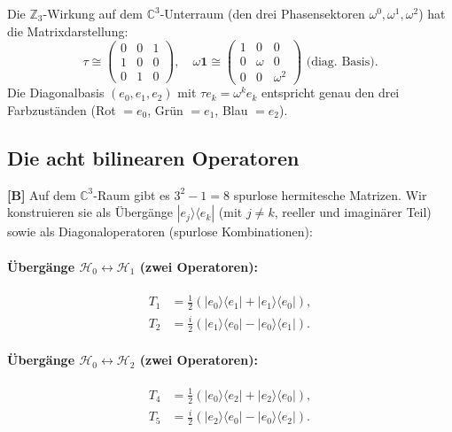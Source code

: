 Die $\mathbb{Z}_3$-Wirkung auf dem $\mathbb{C}^3$-Unterraum
(den drei Phasensektoren $\omega^0, \omega^1, \omega^2$) hat die
Matrixdarstellung:
\begin{equation}
  \tau \cong
  \begin{pmatrix} 0 & 0 & 1 \\ 1 & 0 & 0 \\ 0 & 1 & 0 \end{pmatrix},
  \quad \omega\mathbf{1} \cong
  \begin{pmatrix} 1 & 0 & 0 \\ 0 & \omega & 0 \\ 0 & 0 & \omega^2 \end{pmatrix}
  \text{ (diag. Basis)}.
  \label{eq:tau_matrix}
\end{equation}
Die Diagonalbasis $(e_0, e_1, e_2)$ mit $\tau e_k = \omega^k e_k$
entspricht genau den drei Farbzuständen (Rot $= e_0$, Grün $= e_1$,
Blau $= e_2$).

\subsection{Die acht bilinearen Operatoren}

\textbf{[B]} Auf dem $\mathbb{C}^3$-Raum gibt es $3^2 - 1 = 8$
spurlose hermitesche Matrizen. Wir konstruieren sie als Übergänge
$|e_j\rangle\langle e_k|$ (mit $j \neq k$, reeller und imaginärer
Teil) sowie als Diagonaloperatoren (spurlose Kombinationen):

\paragraph{Übergänge $\mathcal{H}_0 \leftrightarrow \mathcal{H}_1$
  (zwei Operatoren):}
\begin{align}
  T_1 &= \frac{1}{2}(|e_0\rangle\langle e_1| + |e_1\rangle\langle e_0|),
  \label{eq:T1} \\
  T_2 &= \frac{i}{2}(|e_1\rangle\langle e_0| - |e_0\rangle\langle e_1|).
  \label{eq:T2}
\end{align}

\paragraph{Übergänge $\mathcal{H}_0 \leftrightarrow \mathcal{H}_2$
  (zwei Operatoren):}
\begin{align}
  T_4 &= \frac{1}{2}(|e_0\rangle\langle e_2| + |e_2\rangle\langle e_0|),
  \label{eq:T4} \\
  T_5 &= \frac{i}{2}(|e_2\rangle\langle e_0| - |e_0\rangle\langle e_2|).
  \label{eq:T5}
\end{align}

